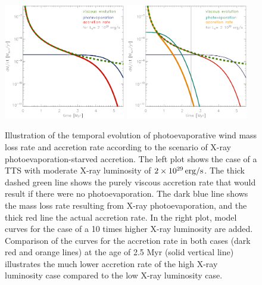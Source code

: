 \documentclass[10pt,fleqn,twoside]{article}
\begin{document}
\begin{figure} %
\centering
\includegraphics[width=0.475\textwidth]{model1.ps}\hspace{5mm}
\includegraphics[width=0.475\textwidth]{model2.ps}
\caption{\small Illustration of the temporal evolution of photoevaporative wind
mass loss rate and accretion rate according to the scenario of
X-ray photoevaporation-starved accretion.
The left plot shows the case of a TTS with moderate X-ray luminosity
of $2 \times 10^{29}\,\rm erg/s$. The thick dashed green line shows the
purely viscous accretion rate that would result if there were
no photoevaporation. The dark blue line shows the mass loss rate resulting
from X-ray photoevaporation, and the thick red line the actual accretion rate.
\newline
In the right plot, model curves for the case of a 10 times
higher X-ray luminosity are added.
Comparison of the curves for the accretion rate in both cases
(dark red and orange lines) at the age of 2.5 Myr (solid vertical line)
illustrates the much lower accretion rate
of the high X-ray luminosity case compared to the low  X-ray luminosity case.
\label{PSA_prediction.fig}}
\end{figure} %
\end{document}
